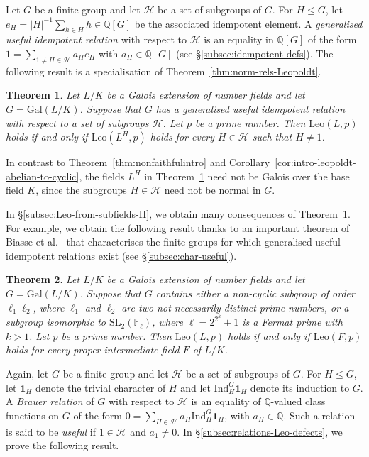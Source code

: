 \documentclass[12pt]{amsart}
\theoremstyle{plain}
\newtheorem{theorem}{Theorem}[section]
\theoremstyle{remark}
\theoremstyle{definition}
\newcommand{\Q}{\mathbb{Q}}
\newcommand{\F}{\mathbb{F}}
\newcommand{\Gal}{\mathrm{Gal}}
\newcommand{\Ind}{\mathrm{Ind}}
\newcommand{\Leo}{\mathrm{Leo}}
\numberwithin{equation}{section}
\begin{document}
Let $G$ be a finite group and let $\mathcal{H}$ be a set of subgroups of $G$. 
For $H \leq G$, let $e_{H}=|H|^{-1}\sum_{h \in H} h \in \Q[G]$ be the associated idempotent element.
A \emph{generalised useful idempotent relation} with respect to $\mathcal{H}$
is an equality in $\Q[G]$ of the form
$1= \sum_{1 \neq H \in \mathcal{H}} a_{H}e_{H}$
with $a_{H} \in \Q[G]$ (see \S \ref{subsec:idempotent-defs}). 
The following result is a specialisation of Theorem~\ref{thm:norm-rels-Leopoldt}. 

\begin{theorem}\label{thm:intro-norm-rels-Leopoldt}
Let $L/K$ be a Galois extension of number fields and let $G=\Gal(L/K)$. 
Suppose that $G$ has a generalised useful idempotent relation with respect to a set of subgroups 
$\mathcal{H}$.
Let $p$ be a prime number.
Then $\Leo(L,p)$ holds if and only if $\Leo(L^{H},p)$ holds for every $H \in \mathcal{H}$ such that $H \neq 1$.
\end{theorem}

In contrast to Theorem~\ref{thm:nonfaithfulintro} and 
Corollary~\ref{cor:intro-leopoldt-abelian-to-cyclic}, 
the fields $L^{H}$ in Theorem~\ref{thm:intro-norm-rels-Leopoldt} 
need not be Galois over the base field $K$,
since the subgroups $H \in \mathcal{H}$ need not be normal in $G$.

In \S \ref{subsec:Leo-from-subfields-II}, we obtain many consequences 
of Theorem~\ref{thm:intro-norm-rels-Leopoldt}.
For example, we obtain the following result thanks to an important theorem 
of Biasse et al.\ \cite{MR4440537} that characterises the finite groups for which
generalised useful idempotent relations exist
(see \S \ref{subsec:char-useful}).

\begin{theorem}\label{thm:intro-reduce-to-subfields}
Let $L/K$ be a Galois extension of number fields and let $G=\Gal(L/K)$.
Suppose that $G$ contains either a non-cyclic subgroup of order $\ell_{1}\ell_{2}$,
where $\ell_{1}$ and $\ell_{2}$ are two not necessarily distinct prime numbers, or a subgroup 
isomorphic to $\mathrm{SL}_{2}(\F_{\ell})$, where $\ell = 2^{2^{k}}+1$ is a Fermat prime
with $k>1$. Let $p$ be a prime number. 
Then $\Leo(L,p)$ holds if and only if $\Leo(F,p)$ holds for every proper intermediate field $F$ of $L/K$. 
\end{theorem}

Again, let $G$ be a finite group and let $\mathcal{H}$ be a set of subgroups of $G$. 
For $H \leq G$, let $\mathbf{1}_{H}$ denote the trivial character of $H$ and let 
$\Ind_{H}^{G}\mathbf{1}_{H}$ denote its induction to $G$.
A \emph{Brauer relation} of $G$ with respect to $\mathcal{H}$ is an equality of 
$\Q$-valued class functions on $G$ of the form
$0=\sum_{H\in\mathcal{H}}a_H\Ind_{H}^{G}\mathbf{1}_{H}$,
with $a_{H} \in \Q$.
Such a relation is said to be \emph{useful} if $1 \in \mathcal{H}$
and $a_{1} \neq 0$.
In \S \ref{subsec:relations-Leo-defects}, we prove the following result.
\end{document}

